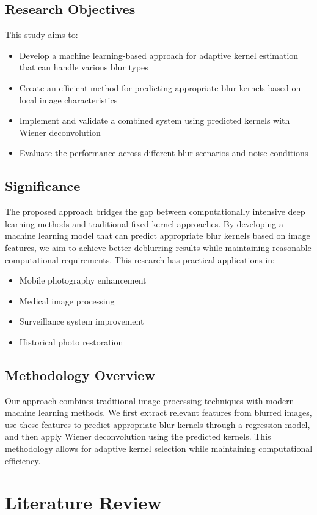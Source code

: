 \documentclass[twoside,11pt]{article}
\begin{document}
\subsection{Research Objectives}
This study aims to:
\begin{itemize}
\item Develop a machine learning-based approach for adaptive kernel estimation that can handle various blur types
\item Create an efficient method for predicting appropriate blur kernels based on local image characteristics
\item Implement and validate a combined system using predicted kernels with Wiener deconvolution
\item Evaluate the performance across different blur scenarios and noise conditions
\end{itemize}
\subsection{Significance}
The proposed approach bridges the gap between computationally intensive deep learning methods and traditional fixed-kernel approaches. By developing a machine learning model that can predict appropriate blur kernels based on image features, we aim to achieve better deblurring results while maintaining reasonable computational requirements. This research has practical applications in:
\begin{itemize}
\item Mobile photography enhancement
\item Medical image processing
\item Surveillance system improvement
\item Historical photo restoration
\end{itemize}
\subsection{Methodology Overview}
Our approach combines traditional image processing techniques with modern machine learning methods. We first extract relevant features from blurred images, use these features to predict appropriate blur kernels through a regression model, and then apply Wiener deconvolution using the predicted kernels. This methodology allows for adaptive kernel selection while maintaining computational efficiency.

\section{Literature Review}
\end{document}
